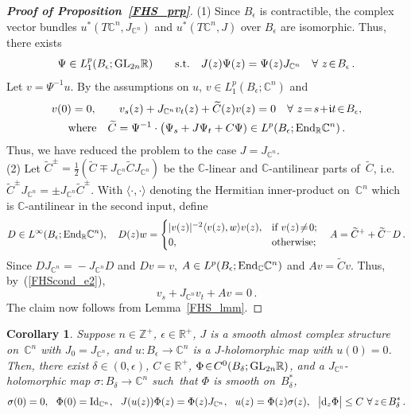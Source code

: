 \documentclass[11pt]{article}
\numberwithin{equation}{section}
\newtheorem{crl}[thm]{Corollary}
\theoremstyle{definition}
\def\eref#1{(\ref{#1})}
\def\ti#1{\widetilde{#1}}
\def\lr#1{\langle#1\rangle}
\def\lra{\longrightarrow}
\def\C{\mathbb{C}}
\def\fI{\mathfrak i}
\def\R{\mathbb R}
\def\Z{{\mathbb Z}}
\def\de{\delta}
\def\ep{\epsilon}
\def\si{\sigma}
\def\i{\infty}
\def\End{\textnormal{End}}
\def\GL{\textnormal{GL}}
\def\Id{\textnormal{Id}}
\def\nd{\textnormal{d}}
\begin{document}
\begin{proof}[{\bf\emph{Proof of Proposition~\ref{FHS_prp}}}]
(1) Since $B_{\ep}$ is contractible, 
the complex vector bundles $u^*(T\C^n,J_{\C^n})$ and $u^*(T\C^n,J)$ over $B_{\ep}$
are isomorphic.
Thus, there exists
$$\Psi\in L_1^p(B_{\ep};\GL_{2n}\R) \qquad\hbox{s.t.}\quad
J(z)\Psi(z)=\Psi(z)J_{\C^n}~~~\forall~z\!\in\!B_{\ep}\,.$$
Let $v\!=\!\Psi^{-1}u$. By the assumptions on $u$, $v\!\in\!L^p_1(B_{\ep};\C^n)$ and
\begin{gather}\label{FHScond_e2} 
v(0)=0, \qquad
v_s(z)+J_{\C^n}v_t(z)+\ti{C}(z)v(z)=0 \quad\forall~z\!=\!s\!+\!\fI t\!\in\!B_{\ep},\\
\hbox{where}\quad
\ti{C}=\Psi^{-1}\cdot\big(\Psi_s+J\Psi_t+C\Psi)
\in L^p(B_{\ep};\End_{\R}\C^n)\,.\notag
\end{gather}
Thus, we have reduced the problem to the case $J\!=\!J_{\C^n}$.\\

\noindent
(2) Let $\ti{C}^{\pm}\!=\!\frac12(\ti{C}\mp J_{\C^n}\ti{C}J_{\C^n})$ be the $\C$-linear
and $\C$-antilinear parts of~$\ti{C}$, i.e.~$\ti{C}^{\pm}J_{\C^n}\!=\pm J_{\C^n}\ti{C}^{\pm}$.
With $\lr{\cdot,\cdot}$ denoting the Hermitian inner-product on~$\C^n$
which is $\C$-antilinear in the second input, define
$$D\in L^{\i}(B_{\ep};\End_{\R}\C^n), \quad
D(z)w=\begin{cases}|v(z)|^{-2}\lr{v(z),w}v(z),&\hbox{if}~v(z)\!\neq\!0;\\
0,&\hbox{otherwise};
\end{cases} \quad
A=\ti{C}^+ +\ti{C}^-D\,.$$
Since $DJ_{\C^n}\!=\!-J_{\C^n}D$ and $Dv\!=\!v$, $A\in L^p(B_{\ep};\End_{\C}\C^n)$ 
and $Av\!=\!\ti{C}v$.
Thus, by~\eref{FHScond_e2}, 
$$v_s+J_{\C^n}v_t+Av=0\,.$$
The claim now follows from Lemma~\ref{FHS_lmm}.
\end{proof}


\begin{crl}\label{FHS_crl}
Suppose $n\!\in\!\Z^+$, $\ep\!\in\!\R^+$, 
$J$ is a smooth almost complex structure on~$\C^n$ with $J_0\!=\!J_{\C^n}$, 
and $u\!:B_{\ep}\!\lra\!\C^n$ is a $J$-holomorphic map with $u(0)\!=\!0$.
Then, there exist $\de\!\in\!(0,\ep)$, $C\!\in\!\R^+$,
$\Phi\!\in\!C^0(B_{\de};\GL_{2n}\R)$, and 
a $J_{\C^n}$-holomorphic map $\si\!:B_{\de}\!\lra\!\C^n$ such~that 
$\Phi$ is smooth on~$B_{\de}^*$, 
$$ \si(0)=0, ~~ \Phi(0)=\Id_{\C^n}, ~~
J(u(z))\Phi(z)=\Phi(z)J_{\C^n},~~u(z)=\Phi(z)\si(z), ~~
\big|\nd_z\Phi\big|\le C~\forall\,z\!\in\!B_{\de}^*\,.$$
\end{crl}
\end{document}
